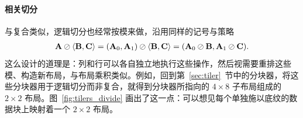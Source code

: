 \paragraph{相关切分}

与复合类似，逻辑切分也经常按模来做，沿用同样的记号与策略
\begin{align*}
\mathbf{A} \oslash \langle \mathbf{B},\mathbf{C} \rangle = (\mathbf{A}_0,\mathbf{A}_1) \oslash \langle \mathbf{B},\mathbf{C} \rangle = (\mathbf{A}_0 \oslash \mathbf{B}, \mathbf{A}_1 \oslash \mathbf{C}).
\end{align*}
这么设计的道理是：列和行可以各自独立地执行这些操作，然后视需要重排这些模、构造新布局，与布局乘积类似。例如，回到第~\ref{sec:tiler}~节中的分块器，将这些分块器用于逻辑切分而非复合，就得到分块器所指向的 $4 {\times} 8$ 子布局组成的 $2 {\times} 2$ 布局。图~\ref{fig:tilers_divide} 画出了这一点：可以想见每个单独施以底纹的数据块上映射着一个 $2 {\times} 2$ 布局。

